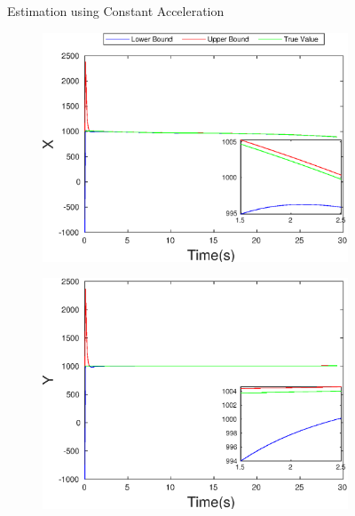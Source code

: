 \begin{figure}[h]
\begin{subfigure}{.5\linewidth}
\end{subfigure}
\caption{Estimation using Constant Acceleration}
\end{figure}



\begin{figure}[h]
\begin{subfigure}{.5\linewidth}
\centering
\includegraphics[width=\linewidth]{figures/HInf/s3pmHInfX}
\end{subfigure}
\begin{subfigure}{.5\linewidth}
\centering
\includegraphics[width=\linewidth]{figures/HInf/s3pmHInfY}
\end{subfigure}
\begin{subfigure}{.5\linewidth}

\end{subfigure}
\end{figure}
